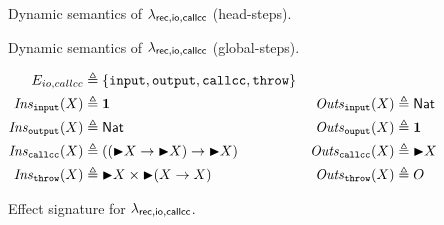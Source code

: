 \begin{figure}
  \caption{Dynamic semantics of $\lambda_{\mathsf{rec},\mathsf{io,callcc}}$ (head-steps).}
  \label{fig:dyn_sem_lang}
\end{figure}

\begin{figure}
  \caption{Dynamic semantics of $\lambda_{\mathsf{rec},\mathsf{io,callcc}}$ (global-steps).}
  \label{fig:dyn_global_sem_lang}
\end{figure}

\begin{figure}
  \begin{align*}
    E_{io, callcc} &\triangleq \{\mathtt{input}, \mathtt{output}, \mathtt{callcc}, \mathtt{throw}\} &\\
    \mathit{Ins}_{\mathtt{input}}(X) &\triangleq \mathbf{1} & \mathit{Outs}_{\mathtt{input}}(X) &\triangleq \mathsf{Nat}\\
    \mathit{Ins}_{\mathtt{output}}(X) &\triangleq \mathsf{Nat} & \mathit{Outs}_{\mathtt{ouput}}(X) &\triangleq \mathbf{1}\\
    \mathit{Ins}_{\mathtt{callcc}}(X) &\triangleq ((\mathord{\blacktriangleright} X \rightarrow \mathord{\blacktriangleright} X) \rightarrow \mathord{\blacktriangleright} X) & \mathit{Outs}_{\mathtt{callcc}}(X) &\triangleq \mathord{\blacktriangleright} X \\
    \mathit{Ins}_{\mathtt{throw}}(X) &\triangleq \mathord{\blacktriangleright} X \times \mathord{\blacktriangleright} (X \rightarrow X) & \mathit{Outs}_{\mathtt{throw}}(X) &\triangleq O
  \end{align*}
  \caption{Effect signature for $\lambda_{\mathsf{rec},\mathsf{io,callcc}}$.}
  \label{fig:eff_sig_lang}
\end{figure}

